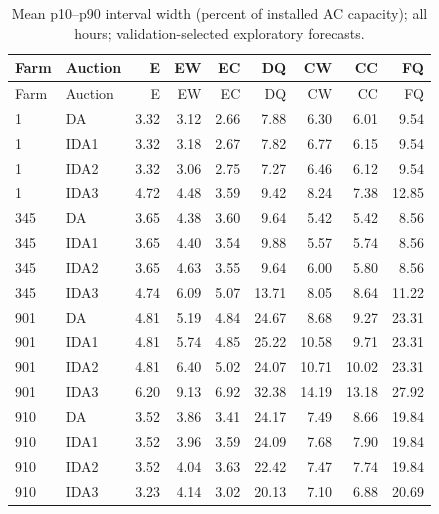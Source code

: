 \documentclass[11pt,a4paper]{article}
\begin{document}
\begin{longtable}{llrrrrrrr}
\caption{Mean p10--p90 interval width (percent of installed AC capacity); all hours; validation-selected exploratory forecasts.}\\
\toprule Farm & Auction & E & EW & EC & DQ & CW & CC & FQ \\
\midrule\endfirsthead
\toprule Farm & Auction & E & EW & EC & DQ & CW & CC & FQ \\
\midrule\endhead
1 & DA & 3.32 & 3.12 & 2.66 & 7.88 & 6.30 & 6.01 & 9.54 \\
1 & IDA1 & 3.32 & 3.18 & 2.67 & 7.82 & 6.77 & 6.15 & 9.54 \\
1 & IDA2 & 3.32 & 3.06 & 2.75 & 7.27 & 6.46 & 6.12 & 9.54 \\
1 & IDA3 & 4.72 & 4.48 & 3.59 & 9.42 & 8.24 & 7.38 & 12.85 \\
\midrule
345 & DA & 3.65 & 4.38 & 3.60 & 9.64 & 5.42 & 5.42 & 8.56 \\
345 & IDA1 & 3.65 & 4.40 & 3.54 & 9.88 & 5.57 & 5.74 & 8.56 \\
345 & IDA2 & 3.65 & 4.63 & 3.55 & 9.64 & 6.00 & 5.80 & 8.56 \\
345 & IDA3 & 4.74 & 6.09 & 5.07 & 13.71 & 8.05 & 8.64 & 11.22 \\
\midrule
901 & DA & 4.81 & 5.19 & 4.84 & 24.67 & 8.68 & 9.27 & 23.31 \\
901 & IDA1 & 4.81 & 5.74 & 4.85 & 25.22 & 10.58 & 9.71 & 23.31 \\
901 & IDA2 & 4.81 & 6.40 & 5.02 & 24.07 & 10.71 & 10.02 & 23.31 \\
901 & IDA3 & 6.20 & 9.13 & 6.92 & 32.38 & 14.19 & 13.18 & 27.92 \\
\midrule
910 & DA & 3.52 & 3.86 & 3.41 & 24.17 & 7.49 & 8.66 & 19.84 \\
910 & IDA1 & 3.52 & 3.96 & 3.59 & 24.09 & 7.68 & 7.90 & 19.84 \\
910 & IDA2 & 3.52 & 4.04 & 3.63 & 22.42 & 7.47 & 7.74 & 19.84 \\
910 & IDA3 & 3.23 & 4.14 & 3.02 & 20.13 & 7.10 & 6.88 & 20.69 \\
\midrule
\bottomrule\end{longtable}
\normalsize
\small
\end{document}
